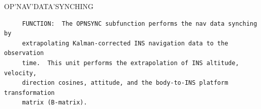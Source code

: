 \begin{frame}
OP'NAV'DATA'SYNCHING
\begin{verbatim}
     FUNCTION:  The OPNSYNC subfunction performs the nav data synching by
     extrapolating Kalman-corrected INS navigation data to the observation
     time.  This unit performs the extrapolation of INS altitude, velocity, 
     direction cosines, attitude, and the body-to-INS platform transformation 
     matrix (B-matrix).


\end{verbatim}
\end{frame}
